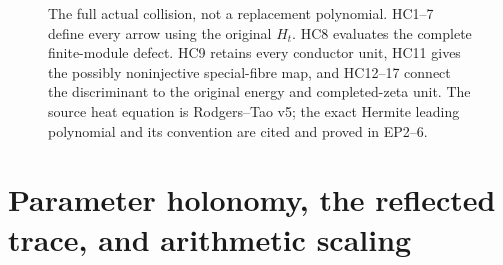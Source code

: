 \documentclass[11pt,a4paper]{article}
\theoremstyle{definition}\newtheorem{definition}[theorem]{Definition}
\begin{document}
\begin{figure}[p]
\centering
{}
\caption{The full actual collision, not a replacement polynomial.
HC1--7 define every arrow using the original $H_t$. HC8 evaluates
the complete finite-module defect. HC9 retains every conductor
unit, HC11 gives the possibly noninjective special-fibre map, and
HC12--17 connect the discriminant to the original energy and
completed-zeta unit. The source heat equation is Rodgers--Tao v5;
the exact Hermite leading polynomial and its convention are cited
and proved in EP2--6.}
\end{figure}

\section{Parameter holonomy, the reflected trace, and arithmetic scaling}
\label{sec:hh}
\newcommand{\HH}{\refstepcounter{hh}\par\medskip\noindent\textbf{\thehh.}\ }
\end{document}
